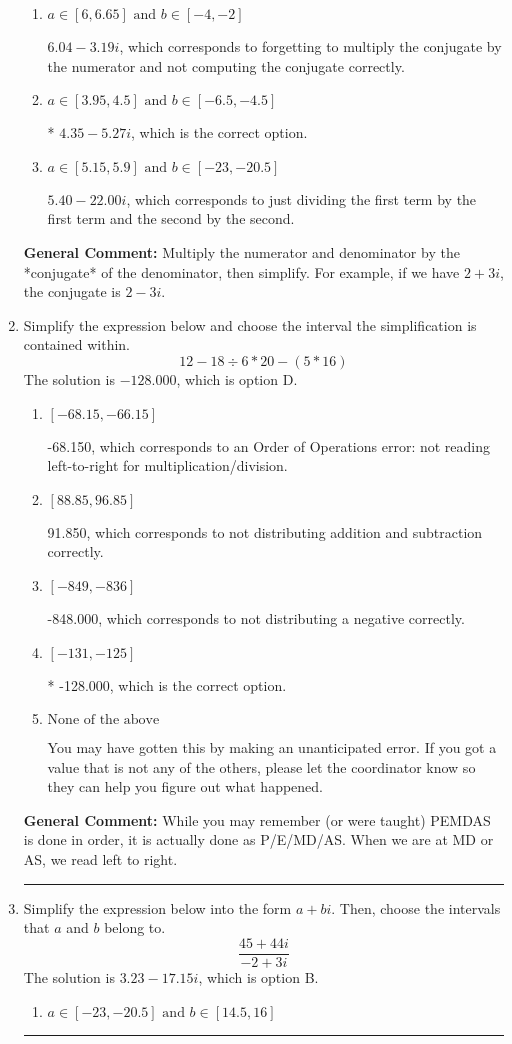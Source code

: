 \documentclass{extbook}[14pt]
\newcommand{\litem}[1]{\item #1

\rule{\textwidth}{0.4pt}}
\begin{document}
\begin{enumerate}
{\begin{enumerate}[label=\Alph*.]
 $113.00  - 5.27 i$, which corresponds to forgetting to multiply the conjugate by the numerator and using a plus instead of a minus in the denominator.
\item \( a \in [6, 6.65] \text{ and } b \in [-4, -2] \)

 $6.04  - 3.19 i$, which corresponds to forgetting to multiply the conjugate by the numerator and not computing the conjugate correctly.
\item \( a \in [3.95, 4.5] \text{ and } b \in [-6.5, -4.5] \)

* $4.35  - 5.27 i$, which is the correct option.
\item \( a \in [5.15, 5.9] \text{ and } b \in [-23, -20.5] \)

 $5.40  - 22.00 i$, which corresponds to just dividing the first term by the first term and the second by the second.
\end{enumerate}

\textbf{General Comment:} Multiply the numerator and denominator by the *conjugate* of the denominator, then simplify. For example, if we have $2+3i$, the conjugate is $2-3i$.
}
\litem{
Simplify the expression below and choose the interval the simplification is contained within.
\[ 12 - 18 \div 6 * 20 - (5 * 16) \]The solution is \( -128.000 \), which is option D.\begin{enumerate}[label=\Alph*.]
\item \( [-68.15, -66.15] \)

 -68.150, which corresponds to an Order of Operations error: not reading left-to-right for multiplication/division.
\item \( [88.85, 96.85] \)

 91.850, which corresponds to not distributing addition and subtraction correctly.
\item \( [-849, -836] \)

 -848.000, which corresponds to not distributing a negative correctly.
\item \( [-131, -125] \)

* -128.000, which is the correct option.
\item \( \text{None of the above} \)

 You may have gotten this by making an unanticipated error. If you got a value that is not any of the others, please let the coordinator know so they can help you figure out what happened.
\end{enumerate}

\textbf{General Comment:} While you may remember (or were taught) PEMDAS is done in order, it is actually done as P/E/MD/AS. When we are at MD or AS, we read left to right.
}
\litem{
Simplify the expression below into the form $a+bi$. Then, choose the intervals that $a$ and $b$ belong to.
\[ \frac{45 + 44 i}{-2 + 3 i} \]The solution is \( 3.23  - 17.15 i \), which is option B.\begin{enumerate}[label=\Alph*.]
\item \( a \in [-23, -20.5] \text{ and } b \in [14.5, 16] \)


\end{enumerate}}
\end{enumerate}
\end{document}
